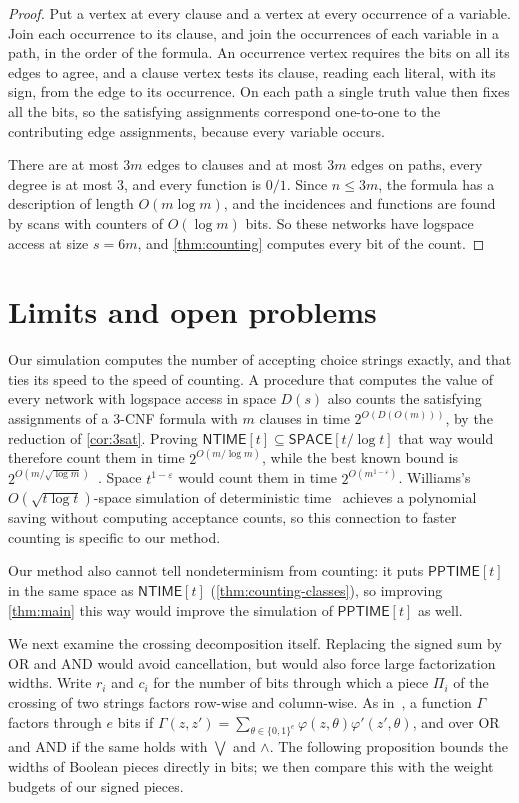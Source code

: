 \documentclass[11pt]{article}
\theoremstyle{definition}
\theoremstyle{definition}
\theoremstyle{remark}
\newcommand{\NTIME}{\mathsf{NTIME}}
\newcommand{\SPACE}{\mathsf{SPACE}}
\newcommand{\PPTIME}{\mathsf{PPTIME}}
\begin{document}
\begin{proof}
Put a vertex at every clause and a vertex at every occurrence of a variable. Join each occurrence to its clause, and join the occurrences of each variable in a path, in the order of the formula. An occurrence vertex requires the bits on all its edges to agree, and a clause vertex tests its clause, reading each literal, with its sign, from the edge to its occurrence. On each path a single truth value then fixes all the bits, so the satisfying assignments correspond one-to-one to the contributing edge assignments, because every variable occurs.

There are at most $3m$ edges to clauses and at most $3m$ edges on paths, every degree is at most $3$, and every function is $0/1$. Since $n\le3m$, the formula has a description of length $O(m\log m)$, and the incidences and functions are found by scans with counters of $O(\log m)$ bits. So these networks have logspace access at size $s=6m$, and \cref{thm:counting} computes every bit of the count.
\end{proof}

\section{Limits and open problems}\label{sec:discussion}

Our simulation computes the number of accepting choice strings exactly, and that ties its speed to the speed of counting. A procedure that computes the value of every network with logspace access in space $D(s)$ also counts the satisfying assignments of a $3$-CNF formula with $m$ clauses in time $2^{O(D(O(m)))}$, by the reduction of \cref{cor:3sat}. Proving $\NTIME[t]\subseteq\SPACE[t/\log t]$ that way would therefore count them in time $2^{O(m/\log m)}$, while the best known bound is $2^{O(m/\sqrt{\log m})}$~\cite{Ope26,Ant26}. Space $t^{1-\varepsilon}$ would count them in time $2^{O(m^{1-\varepsilon})}$. Williams's $O(\sqrt{t\log t})$-space simulation of deterministic time~\cite{Wil25} achieves a polynomial saving without computing acceptance counts, so this connection to faster counting is specific to our method.

Our method also cannot tell nondeterminism from counting: it puts $\PPTIME[t]$ in the same space as $\NTIME[t]$ (\cref{thm:counting-classes}), so improving \cref{thm:main} this way would improve the simulation of $\PPTIME[t]$ as well.

We next examine the crossing decomposition itself. Replacing the signed sum by OR and AND would avoid cancellation, but would also force large factorization widths. Write $r_i$ and $c_i$ for the number of bits through which a piece $\Pi_i$ of the crossing of two strings factors row-wise and column-wise. As in~\cite{Ant26}, a function $\Gamma$ factors through $e$ bits if $\Gamma(z,z')=\sum_{\theta\in\{0,1\}^e}\varphi(z,\theta)\varphi'(z',\theta)$, and over OR and AND if the same holds with $\bigvee$ and $\wedge$. The following proposition bounds the widths of Boolean pieces directly in bits; we then compare this with the weight budgets of our signed pieces.
\end{document}
